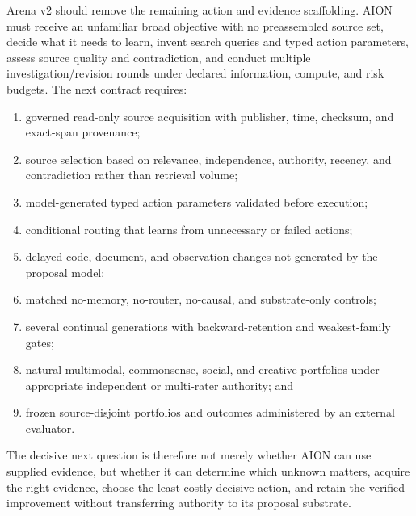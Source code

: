 Arena v2 should remove the remaining action and evidence scaffolding.  AION
must receive an unfamiliar broad objective with no preassembled source set,
decide what it needs to learn, invent search queries and typed action
parameters, assess source quality and contradiction, and conduct multiple
investigation/revision rounds under declared information, compute, and risk
budgets.  The next contract requires:
\begin{enumerate}
  \item governed read-only source acquisition with publisher, time, checksum,
        and exact-span provenance;
  \item source selection based on relevance, independence, authority, recency,
        and contradiction rather than retrieval volume;
  \item model-generated typed action parameters validated before execution;
  \item conditional routing that learns from unnecessary or failed actions;
  \item delayed code, document, and observation changes not generated by the
        proposal model;
  \item matched no-memory, no-router, no-causal, and substrate-only controls;
  \item several continual generations with backward-retention and
        weakest-family gates;
  \item natural multimodal, commonsense, social, and creative portfolios under
        appropriate independent or multi-rater authority; and
  \item frozen source-disjoint portfolios and outcomes administered by an
        external evaluator.
\end{enumerate}

The decisive next question is therefore not merely whether AION can use
supplied evidence, but whether it can determine which unknown matters, acquire
the right evidence, choose the least costly decisive action, and retain the
verified improvement without transferring authority to its proposal substrate.
